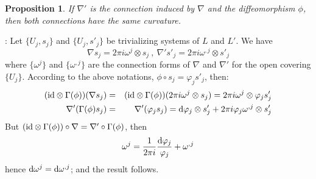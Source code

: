 \documentclass[12pt]{article}
\theoremstyle{plain}
\newtheorem{prop}{Proposition}
\def\beann{\begin{eqnarray*}}
\def\eeann{\end{eqnarray*}}
\def\qed{\ifvmode\removelastskip\fi
{\unskip\nobreak\hfil\penalty50\hbox{}\nobreak\hfil
\hbox{\vrule height1.2ex width1.2ex}\parfillskip=0pt
\finalhyphendemerits=0 \par\smallskip}}
\def\d{{\rm d}}
\begin{document}
\begin{prop}
If $\nabla '$ is the connection induced by
$\nabla$ and the diffeomorphism $\phi$,
then both connections have the same curvature.
\end{prop}
:
Let $\{ U_j,s_j \}$ and $\{ U_j,s'_j \}$ be
trivializing systems of $L$ and $L'$.
We have
$$
\nabla s_j = 2\pi i \omega^j \otimes s_j
\ , \
\nabla ' s'_j = 2\pi i \omega^{,j} \otimes s'_j
$$
where $\{ \omega^j \}$ and $\{ \omega^{,j} \}$
are the connection forms of $\nabla$ and $\nabla '$
for the open covering $\{ U_j \}$.
According to the above notations,
$\phi \circ s_j = \varphi_j s'_j$,
then:
\beann
({\rm id}\otimes \Gamma (\phi))(\nabla s_j)
&=&
({\rm id}\otimes \Gamma (\phi))(2\pi i \omega^j \otimes s_j) =
2\pi i \omega^j \otimes \varphi_j s'_j
\\
\nabla '(\Gamma (\phi)s_j)
&=&
\nabla '(\varphi_j s_j) =
\d \varphi_j \otimes s'_j + 2\pi i \varphi_j \omega^{,j} \otimes s'_j
\eeann
 But $({\rm id}\otimes \Gamma (\phi)) \circ \nabla =
 \nabla '\circ \Gamma (\phi )$, then
$$
\omega^j = \frac{1}{2\pi i}\frac{\d \varphi_j}{\varphi_j} + \omega^{,j}
$$
hence $\d \omega^j = \d \omega^{,j}$; and the result follows.
\qed
\end{document}
